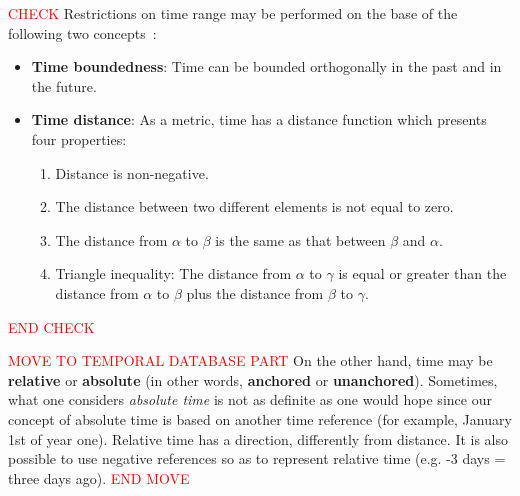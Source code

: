 

\textcolor{red}{CHECK}
Restrictions on time range may be performed on the base of the following two concepts~\cite{Jensen94thetsql2}:
\begin{itemize}
\item
\textbf{Time boundedness}: Time can be bounded orthogonally in the past and in the future.
\item
\textbf{Time distance}: As a metric, time has a distance function which presents four properties:
\begin{enumerate}
\item
Distance is non-negative.
\item
The distance between two different elements is not equal to zero.
\item
The distance from $\alpha$ to $\beta$ is the same as that between $\beta$ and $\alpha$.
\item
Triangle inequality: The distance from $\alpha$ to $\gamma$ is equal or greater than the distance from $\alpha$ to $\beta$ plus the distance from $\beta$ to $\gamma$.
\end{enumerate}
\end{itemize}
\textcolor{red}{END CHECK}

\textcolor{red}{MOVE TO TEMPORAL DATABASE PART}
On the other hand, time may be~\cite{Jensen94thetsql2} \textbf{relative} or \textbf{absolute} (in other words, \textbf{anchored} or \textbf{unanchored}). Sometimes, what one considers \emph{absolute time} is not as definite as one would hope since our concept of absolute time is based on another time reference (for example, January 1st of year one). Relative time has a direction, differently from distance. It is also possible to use negative references so as to represent relative time (e.g. -3 days = three days ago).
\textcolor{red}{END MOVE}

